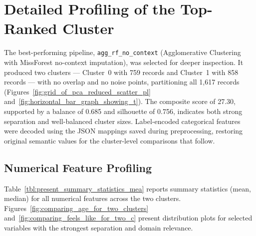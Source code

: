 \section{Detailed Profiling of the Top-Ranked Cluster}

The best-performing pipeline, \texttt{agg\_rf\_no\_context} (Agglomerative Clustering with MissForest no-context imputation), was selected for deeper inspection. It produced two clusters --- Cluster~0 with 759 records and Cluster~1 with 858 records --- with no overlap and no noise points, partitioning all 1{,}617 records (Figures~\ref{fig:grid_of_pca_reduced_scatter_pl} and~\ref{fig:horizontal_bar_graph_showing_t}). The composite score of 27.30, supported by a balance of 0.685 and silhouette of 0.756, indicates both strong separation and well-balanced cluster sizes. Label-encoded categorical features were decoded using the JSON mappings saved during preprocessing, restoring original semantic values for the cluster-level comparisons that follow.

\subsection{Numerical Feature Profiling}

Table~\ref{tbl:present_summary_statistics_mea} reports summary statistics (mean, median) for all numerical features across the two clusters. Figures~\ref{fig:comparing_age_for_two_clusters} and~\ref{fig:comparing_feels_like_for_two_c} present distribution plots for selected variables with the strongest separation and domain relevance.

